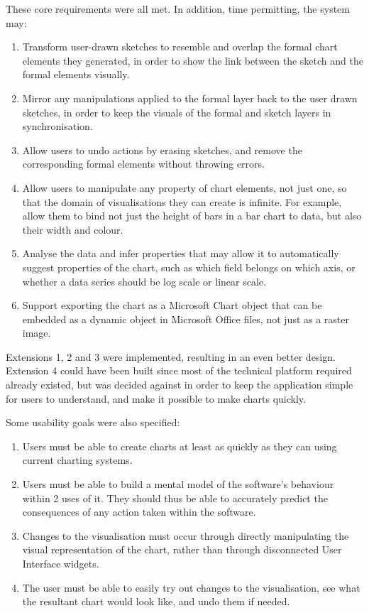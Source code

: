 	These core requirements were all met.
	In addition, time permitting, the system may:
	\begin{enumerate}[label=\bfseries Extension \arabic*]
		\item \label{ext:transform_sketch} Transform user-drawn sketches to resemble and overlap the formal chart elements they generated, in order to show the link between the sketch and the formal elements visually.
		\item \label{ext:formal_to_informal} Mirror any manipulations applied to the formal layer back to the user drawn sketches, in order to keep the visuals of the formal and sketch layers in synchronisation.
		\item \label{ext:erase} Allow users to undo actions by erasing sketches, and remove the corresponding formal elements without throwing errors.
		\item Allow users to manipulate any property of chart elements, not just one, so that the domain of visualisations they can create is infinite. For example, allow them to bind not just the height of bars in a bar chart to data, but also their width and colour. 
		\item Analyse the data and infer properties that may allow it to automatically suggest properties of the chart, such as which field belongs on which axis, or whether a data series should be log scale or linear scale.
		\item Support exporting the chart as a Microsoft Chart object that can be embedded as a dynamic object in Microsoft Office files, not just as a raster image.
	\end{enumerate}
	
	Extensions 1, 2 and 3 were implemented, resulting in an even better design. Extension 4 could have been built since most of the technical platform required already existed, but was decided against in order to keep the application simple for users to understand, and make it possible to make charts quickly.	
	
	Some usability goals were also specified:
	\begin{enumerate}[label=\bfseries Usability \arabic*]
		\item Users must be able to create charts at least as quickly as they can using current charting systems.
		\item Users must be able to build a mental model of the software's behaviour within 2 uses of it. They should thus be able to accurately predict the consequences of any action taken within the software.
		\item Changes to the visualisation must occur through directly manipulating the visual representation of the chart, rather than through disconnected User Interface widgets.
		\item The user must be able to easily try out changes to the visualisation, see what the resultant chart would look like, and undo them if needed.
	\end{enumerate}
	
